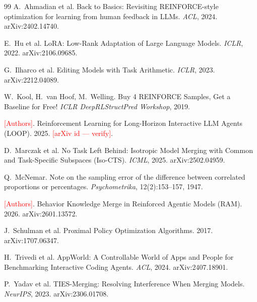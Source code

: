 \documentclass[11pt]{article}
\newcommand{\TODO}[1]{\textcolor{red}{[#1]}} %
\begin{document}
\begin{thebibliography}{99}
\small
{}
A.~Ahmadian et al. Back to Basics: Revisiting REINFORCE-style optimization for learning
from human feedback in LLMs. \emph{ACL}, 2024. arXiv:2402.14740.

E.~Hu et al. LoRA: Low-Rank Adaptation of Large Language Models. \emph{ICLR}, 2022.
arXiv:2106.09685.

G.~Ilharco et al. Editing Models with Task Arithmetic. \emph{ICLR}, 2023. arXiv:2212.04089.

W.~Kool, H.~van Hoof, M.~Welling. Buy 4 REINFORCE Samples, Get a Baseline for Free!
\emph{ICLR DeepRLStructPred Workshop}, 2019.

\TODO{Authors}. Reinforcement Learning for Long-Horizon Interactive LLM Agents (LOOP).
2025. \TODO{arXiv id --- verify}.

D.~Marczak et al. No Task Left Behind: Isotropic Model Merging with Common and
Task-Specific Subspaces (Iso-CTS). \emph{ICML}, 2025. arXiv:2502.04959.

Q.~McNemar. Note on the sampling error of the difference between correlated proportions or
percentages. \emph{Psychometrika}, 12(2):153--157, 1947.

\TODO{Authors}. Behavior Knowledge Merge in Reinforced Agentic Models (RAM). 2026.
arXiv:2601.13572.

J.~Schulman et al. Proximal Policy Optimization Algorithms. 2017. arXiv:1707.06347.

H.~Trivedi et al. AppWorld: A Controllable World of Apps and People for Benchmarking
Interactive Coding Agents. \emph{ACL}, 2024. arXiv:2407.18901.

P.~Yadav et al. TIES-Merging: Resolving Interference When Merging Models. \emph{NeurIPS},
2023. arXiv:2306.01708.
\end{thebibliography}
\end{document}
